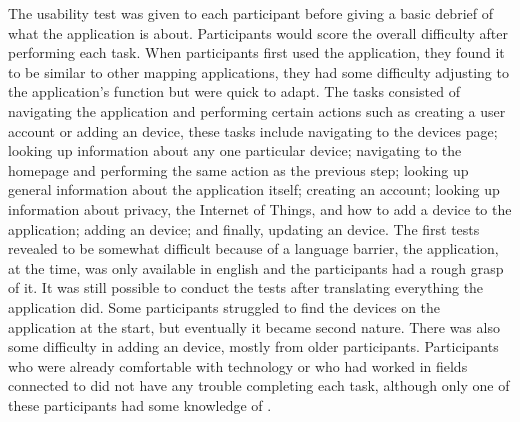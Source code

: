 The usability test was given to each participant before giving a basic debrief
of what the application is about. Participants would score the overall difficulty
after performing each task. When participants first used the application, they
found it to be similar to other mapping applications, they had some difficulty
adjusting to the application's function but were quick to adapt. The tasks consisted
of navigating the application and performing certain actions such as creating
a user account or adding an \hyperlink{\acronym}{\acronym} device, these tasks include navigating to the \hyperlink{\acronym}{\acronym} devices
page; looking up information about any one particular device; navigating to the
homepage and performing the same action as the previous step; looking up
general information about the application itself; creating an account;
looking up information about privacy, the Internet of Things, and how
to add a device to the application; adding an \hyperlink{\acronym}{\acronym} device; and finally,
updating an \hyperlink{\acronym}{\acronym} device. The first tests revealed to be
somewhat difficult because of a language barrier, the application, at the
time, was only available in english and the participants had a rough grasp of it.
It was still possible to conduct the tests after translating everything the application
did.
Some participants struggled to
find the \hyperlink{\acronym}{\acronym} devices on the application at the start, but eventually it
became second nature. There was also some difficulty in adding an \hyperlink{\acronym}{\acronym} device,
mostly from older participants. Participants who were already comfortable with
technology or who had worked in fields connected to \hyperlink{\acronym}{\acronym} did not have any trouble
completing each task, although only one of these participants had some knowledge
of \hyperlink{\acronym}{\acronym}.

